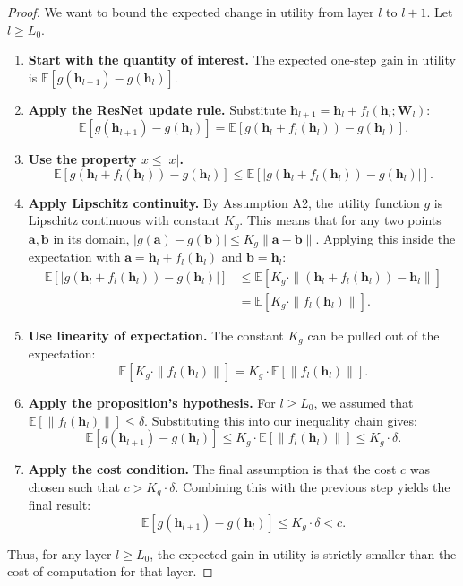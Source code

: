 \documentclass[12pt]{imsart}
\newcommand{\E}{\mathbb{E}}
\newcommand{\h}{\mathbf{h}}
\newcommand{\W}{\mathbf{W}}
\theoremstyle{plain}
\theoremstyle{definition}
\begin{document}
\begin{proof}
We want to bound the expected change in utility from layer $l$ to $l+1$. Let $l \ge L_0$.
\begin{enumerate}
    \item \textbf{Start with the quantity of interest.} The expected one-step gain in utility is $\E[g(\h_{l+1}) - g(\h_l)]$.

    \item \textbf{Apply the ResNet update rule.} Substitute $\h_{l+1} = \h_l + f_l(\h_l; \W_l)$:
    \[ \E[g(\h_{l+1}) - g(\h_l)] = \E[g(\h_l + f_l(\h_l)) - g(\h_l)]. \]

    \item \textbf{Use the property $x \le |x|$.}
    \[ \E[g(\h_l + f_l(\h_l)) - g(\h_l)] \le \E\left[ \left| g(\h_l + f_l(\h_l)) - g(\h_l) \right| \right]. \]

    \item \textbf{Apply Lipschitz continuity.} By Assumption A2, the utility function $g$ is Lipschitz continuous with constant $K_g$. This means that for any two points $\mathbf{a}, \mathbf{b}$ in its domain, $|g(\mathbf{a}) - g(\mathbf{b})| \le K_g \|\mathbf{a} - \mathbf{b}\|$. Applying this inside the expectation with $\mathbf{a} = \h_l + f_l(\h_l)$ and $\mathbf{b} = \h_l$:
    \begin{align*}
    \E\left[ \left| g(\h_l + f_l(\h_l)) - g(\h_l) \right| \right] &\le \E[K_g \cdot \|(\h_l + f_l(\h_l)) - \h_l\|] \\
    &= \E[K_g \cdot \|f_l(\h_l)\|].
    \end{align*}

    \item \textbf{Use linearity of expectation.} The constant $K_g$ can be pulled out of the expectation:
    \[ \E[K_g \cdot \|f_l(\h_l)\|] = K_g \cdot \E[\|f_l(\h_l)\|]. \]

    \item \textbf{Apply the proposition's hypothesis.} For $l \ge L_0$, we assumed that $\E[\|f_l(\h_l)\|] \le \delta$. Substituting this into our inequality chain gives:
    \[ \E[g(\h_{l+1}) - g(\h_l)] \le K_g \cdot \E[\|f_l(\h_l)\|] \le K_g \cdot \delta. \]

    \item \textbf{Apply the cost condition.} The final assumption is that the cost $c$ was chosen such that $c > K_g \cdot \delta$. Combining this with the previous step yields the final result:
    \[ \E[g(\h_{l+1}) - g(\h_l)] \le K_g \cdot \delta < c. \]
\end{enumerate}
Thus, for any layer $l \ge L_0$, the expected gain in utility is strictly smaller than the cost of computation for that layer.
\end{proof}
\end{document}
